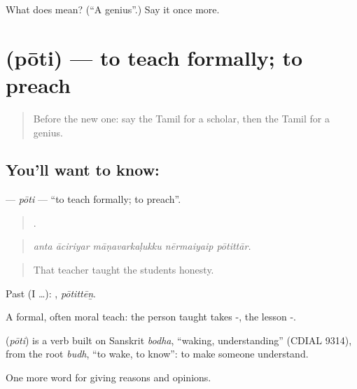 \begin{tcolorbox}[breakable,colback=teal!4,colframe=teal!35!black,title={Before you move on}]
What does  mean? (\textquotedblleft{}A genius\textquotedblright{}.) Say it once more.
\end{tcolorbox}
\section[\texorpdfstring{\ta{போதி} (pōti)}{போதி (pōti)}]{ (pōti) — to teach formally; to preach}

\label{lesson:TA-C367-poti}



\begin{quote}
Before the new one: say the Tamil for a scholar, then the Tamil for a genius.
\end{quote}

\subsection*{You'll want to know: }
\textbf{} — \emph{pōti} — \textquotedblleft{}to teach formally; to preach\textquotedblright{}.

\begin{quote}
    .
\end{quote}

\begin{quote}
\emph{anta āciriyar māṇavarkaḷukku nērmaiyaip pōtittār.}
\end{quote}

\begin{quote}
That teacher taught the students honesty.
\end{quote}

Past (I …): , \emph{pōtittēṉ}.

A formal, often moral teach: the person taught takes -, the lesson -.

\begin{cousinweb}
\textbf{} (\emph{pōti}) is a verb built on Sanskrit \emph{bodha}, \textquotedblleft{}waking, understanding\textquotedblright{} (CDIAL 9314), from the root \emph{budh}, \textquotedblleft{}to wake, to know\textquotedblright{}: to make someone understand.
\end{cousinweb}

\begin{grammarlens}[title={What you've built}]
One more word for giving reasons and opinions.
\end{grammarlens}

